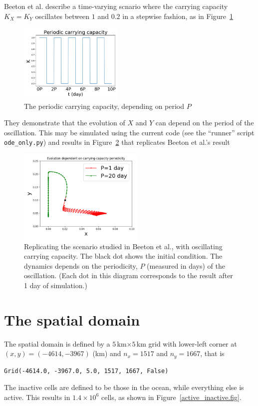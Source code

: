 \documentclass{article}
\begin{document}
Beeton et al. describe a time-varying scnario where the carrying capacity $K_{X}=K_{Y}$ oscillates between $1$ and $0.2$ in a stepwise fashion, as in Figure~\ref{ode_K.fig}

\begin{figure}[htb]
  \centering
  \includegraphics[width=5cm]{ode_K.png}
  \caption{\label{ode_K.fig}The periodic carrying capacity, depending on period $P$}
\end{figure}


They demonstrate that the evolution of $X$ and $Y$ can depend on the period of the oscillation.  This may be simulated using the current code (see the ``runner'' script {\tt ode\_only.py}) and results in Figure~\ref{ode_only.fig} that replicates Beeton et al.'s result

\begin{figure}[htb]
  \centering
  \includegraphics[width=6cm]{ode_only.png}
  \caption{\label{ode_only.fig}Replicating the scenario studied in Beeton et al., with oscillating carrying capacity.  The black dot shows the initial condition.  The dynamics depends on the periodicity, $P$ (measured in days) of the oscillation.  (Each dot in this diagram corresponds to the result after 1 day of simulation.)}
\end{figure}


\section{The spatial domain}

The spatial domain is defined by a $5$\,km$\times 5$\,km grid with lower-left corner at $(x,y)=(-4614,-3967)$ (km) and $n_{x}=1517$ and $n_{y}=1667$, that is
\begin{verbatim}
Grid(-4614.0, -3967.0, 5.0, 1517, 1667, False)
\end{verbatim}
The inactive cells are defined to be those in the ocean, while everything else is active.  This results in $1.4\times 10^{6}$ cells, as shown in Figure~\ref{active_inactive.fig}.
\end{document}
